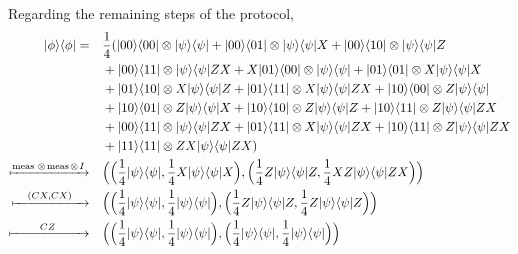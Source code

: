 Regarding the remaining steps of the protocol, 
\begin{equation} \label{eq:teleport_measure}
  \begin{split}
    |\phi\rangle \langle \phi| = \quad & \frac{1}{4} (|00\rangle \langle 00| \otimes |\psi\rangle \langle \psi| + |00\rangle  \langle 01| \otimes |\psi\rangle \langle \psi| X + |00\rangle  \langle 10| \otimes |\psi\rangle \langle \psi| Z     \\ 
    & + |00\rangle  \langle 11| \otimes |\psi\rangle \langle \psi| ZX + X|01 \rangle \langle 00| \otimes |\psi\rangle \langle \psi| + |01 \rangle \langle 01| \otimes X|\psi\rangle \langle \psi|X    \\
    & + |01 \rangle \langle 10| \otimes X|\psi\rangle \langle \psi|Z + |01 \rangle \langle 11| \otimes X|\psi\rangle \langle \psi|ZX  + |10 \rangle \langle 00| \otimes Z|\psi\rangle \langle \psi|   \\
    & + |10 \rangle \langle 01| \otimes Z|\psi\rangle \langle \psi| X + |10 \rangle \langle 10| \otimes Z|\psi\rangle \langle \psi| Z + |10 \rangle \langle 11| \otimes Z|\psi\rangle \langle \psi| ZX \\
    & + |00 \rangle \langle 11| \otimes |\psi\rangle \langle \psi| ZX + |01 \rangle \langle 11| \otimes X|\psi\rangle \langle \psi| ZX + |10 \rangle \langle 11| \otimes Z|\psi\rangle \langle \psi| ZX  \\
    & + |11 \rangle \langle 11| \otimes ZX|\psi\rangle \langle \psi| ZX) \\
    \xmapsto{ \text{meas } \otimes \hspace{1pt} \text{meas} \hspace{1pt}  \otimes \hspace{1pt} I} \quad & \Big(\Big(\frac{1}{4} |\psi\rangle \langle \psi|, \frac{1}{4} X|\psi\rangle \langle \psi|X\Big),\Big(\frac{1}{4} Z|\psi\rangle \langle \psi|Z, \frac{1}{4}  XZ|\psi\rangle \langle \psi|ZX \Big)\Big) \\
    \xmapsto{\hspace{10pt}(CX, CX)\hspace{10pt}} \quad & \Big(\Big(\frac{1}{4} |\psi\rangle \langle \psi|, \frac{1}{4} |\psi\rangle \langle \psi|\Big),\Big(\frac{1}{4} Z|\psi\rangle \langle \psi|Z, \frac{1}{4}  Z|\psi\rangle \langle \psi|Z \Big)\Big) \\ 
     \xmapsto{\hspace{22pt} CZ \hspace{23pt}} \quad& \Big(\Big(\frac{1}{4} |\psi\rangle \langle \psi|, \frac{1}{4} |\psi\rangle \langle \psi|\Big),\Big(\frac{1}{4} |\psi\rangle \langle \psi|, \frac{1}{4}  |\psi\rangle \langle \psi| \Big)\Big)
  \end{split}
\end{equation}



